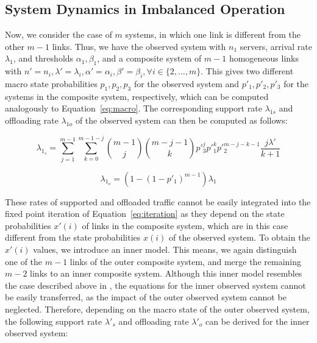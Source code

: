 \subsection{System Dynamics in Imbalanced Operation}\label{sec:aggregation:imbalanced:analytical_model}



Now, we consider the case of $m$ systems, in which one link is different from the other $m-1$ links. Thus, we have the observed system with $n_1$ servers, arrival rate $\lambda_1$, and thresholds $\alpha_1, \beta_1$, and a composite system of $m-1$ homogeneous links with $n'=n_i, \lambda'=\lambda_i, \alpha'=\alpha_i, \beta'=\beta_i, \forall i\in\{2,\ldots,m\}$. This gives two different macro state probabilities $p_1, p_2, p_3$ for the observed system and $p'_1, p'_2, p'_3$ for the systems in the composite system, respectively, which can be computed analogously to Equation~\ref{eq:macro}. The corresponding support rate $\lambda_{1s}$ and offloading rate $\lambda_{1o}$ of the observed system can then be computed as follows:

\begin{equation}
\lambda_{1_s} = \sum_{j=1}^{m-1}\sum_{k=0}^{m-1-j} \binom{m-1}{j}\binom{m-j-1}{k}p'^j_3 p'^k_1 p'^{m-j-k-1}_2\frac{j\lambda'}{k+1}
\end{equation}

\begin{equation}
\lambda_{1_o} = (1-(1-p'_1)^{m-1})\lambda_1
\end{equation}

These rates of supported and offloaded traffic cannot be easily integrated into the fixed point iteration of Equation~\ref{eq:iteration} as they depend on the state probabilities $x'(i)$ of links in the composite system, which are in this case different from the state probabilities $x(i)$ of the observed system.
To obtain the $x'(i)$ values, we introduce an inner model.
This means, we again distinguish one of the $m-1$ links of the outer composite system, and merge the remaining $m-2$ links to an inner composite system. Although this inner model resembles the case described above in , the equations for the inner observed system cannot be easily transferred, as the impact of the outer observed system cannot be neglected. Therefore, depending on the macro state of the outer observed system, the following support rate $\lambda'_s$ and offloading rate $\lambda'_o$ can be derived for the inner observed system:


